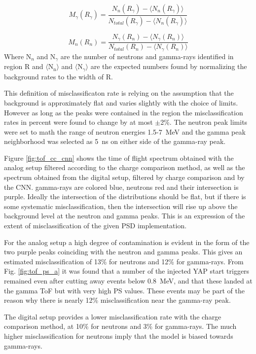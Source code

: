 \documentclass[main.tex]{subfiles}
\begin{document}
\begin{equation}
	M_\gamma(R_\gamma) = \frac{N_{n}(R_\gamma)-\langle N_n(R_\gamma)\rangle}{N_{total}(R_\gamma)-\langle N_n(R_\gamma)\rangle}
\end{equation}

\begin{equation}
	M_n(R_n) = \frac{N_{\gamma}(R_n)-\langle N_\gamma(R_n)\rangle}{N_{total}(R_n)-\langle N_\gamma(R_n)\rangle}
\end{equation}
Where N$_n$ and N$_\gamma$ are the number of neutrons and gamma-rays identified in region R and $\langle \textrm{N}_\textrm{n}\rangle$ and $\langle \textrm{N}_\gamma\rangle$ are the expected numbers found by normalizing the background rates to the width of R.

This definition of misclassificaton rate is relying on the assumption that the background is approximately flat and varies slightly with the choice of limits. However as long as the peaks were contained in the region the misclassification rates in percent were found to change by at most $\pm$2\%. The neutron peak limits were set to math the range of neutron energies 1.5-\SI{7}{\MeV} and the gamma peak neighborhood was selected as \SI{5}{\ns} on either side of the gamma-ray peak.

Figure \ref{fig:tof_cc_cnn} shows the time of flight spectrum obtained with the analog setup filtered according to the charge comparison method, as well as the spectrum obtained from the digital setup, filtered by charge comparison and by the CNN. gamma-rays are colored blue, neutrons red and their intersection is purple. Ideally the intersection of the distributions should be flat, but if there is some systematic misclassification, then the intersection will rise up above the background level at the neutron and gamma peaks. This is an expression of the extent of misclassification of the given PSD implementation.

For the analog setup a high degree of contamination is evident in the form of the two purple peaks coinciding with the neutron and gamma peaks. This gives an estimated misclassification of 13\% for neutrons and 12\% for gamma-rays. From Fig. \ref{fig:tof_ps_a} it was found that a number of the injected YAP start triggers remained even after cutting away events below \SI{0.8}{\MeV}, and that these landed at the gamma ToF but with very high PS values. These events may be part of the reason why there is nearly 12\% misclassification near the gamma-ray peak.

The digital setup provides a lower misclassification rate with the charge comparison method, at 10\% for neutrons and 3\% for gamma-rays. The much higher misclassification for neutrons imply that the model is biased towards gamma-rays.
\end{document}
